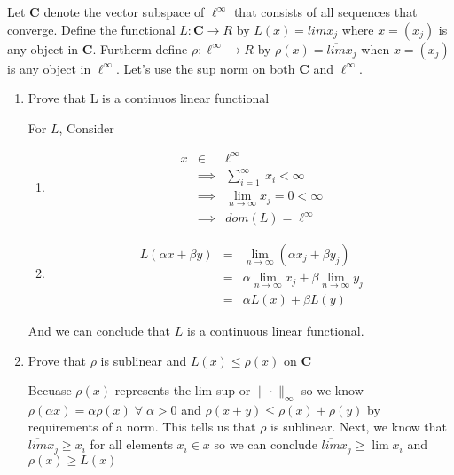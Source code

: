 \documentclass[11pt]{SelfArxOneColBMN}
\begin{document}
\begin{exercise}
  Let $\mathbf{C}$ denote the vector subspace of $\ell^\infty$ that consists of all sequences that converge. Define the functional $L: \mathbf{C} \rightarrow R$ by $L(x) = lim x_j$ where $x = (x_j)$ is any object in $\mathbf{C}$. Furtherm define $\rho: \ell^\infty \rightarrow R$ by $\rho(x) = \overline{lim}x_j$ when $x = (x_j)$ is any object in $\ell^\infty$. Let's use the sup norm on both $\mathbf{C}$ and $\ell^\infty$.
  \begin{enumerate}
    \item Prove that L is a continuos linear functional
    \begin{solution}
      For $L$, Consider
      \begin{enumerate}
        \item
        \begin{eqnarray*}
          x &\in& \ell^\infty\\
          &\implies& \sum_{i = 1}^\infty\:x_i < \infty\\
          &\implies& \lim_{n\rightarrow\infty}x_j = 0 < \infty\\
          &\implies& dom(L) = \ell^\infty
        \end{eqnarray*}
        \item
        \begin{eqnarray*}
          L(\alpha x + \beta y) &=& \lim_{n \rightarrow \infty}(\alpha x_j + \beta y_j)\\
          &=& \alpha\lim_{n \rightarrow \infty}x_j + \beta \lim_{n \rightarrow \infty}y_j\\
          &=& \alpha L(x) + \beta L(y)
        \end{eqnarray*}
      \end{enumerate}
      And we can conclude that $L$ is a continuous linear functional.
    \end{solution}
    \item Prove that $\rho$ is sublinear and $L(x) \leq \rho(x)$ on $\mathbf{C}$
    \begin{solution}
      Becuase $\rho(x)$ represents the lim sup or $\|\cdot\|_\infty$ so we know $\rho(\alpha x) = \alpha \rho(x) \; \forall \; \alpha > 0$ and $\rho(x + y) \leq \rho(x) + \rho(y)$ by requirements of a norm. This tells us that $\rho$ is sublinear. Next, we know that $\overline{lim}x_j \geq x_i$ for all elements $x_i \in x$ so we can conclude $\overline{lim}x_j \geq \lim x_i$ and $\rho(x) \geq L(x)$
    \end{solution}

\end{enumerate}
\end{exercise}
\end{document}
